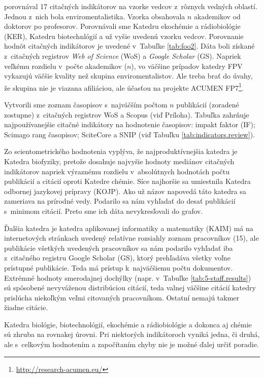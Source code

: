 \citet{Wildgaard2015} porovnával 17 citačných indikátorov na vzorke vedcov
z~rôznych vedných oblastí. Jednou z~nich bola enviromentalistika. Vzorka
obsahovala $n$ akademikov od doktorov po profesorov. Porovnávali sme Katedru
ekochémie a rádiobiológie (KER), Katedru biotechnlógií a už vyšie uvedenú vzorku
vedcov.  Porovnanie hodnôt citačných indikátorov je uvedené v~Tabuľke
\ref{tab:foo2}.  Dáta boli získané z~citačných registrov \emph{Web of
Science} (WoS) a \emph{Google Scholar} (GS).  Napriek veľkému rozdielu v~počte
akademikov ($n$), vo väčšine prípadov katedry FPV vykazujú väčšie kvality než
skupina enviromentalistov. Ale treba brať do úvahy, že skupina nie je viazana
afiliáciou, ale účasťou na projekte ACUMEN
FP7\footnote{\url{http://research-acumen.eu/}}.

Vytvorili sme zoznam časopisov s~najväčším počtom $n$ publikácií (zoradené
zostupne) z~citačných registrov WoS a Scopus (viď Príloha).  Tabuľka zahrňuje
najpoužívanejšie citačné indikátory na hodnotenie časopisov: impakt faktor
(IF); Scimago rang časopisov; SciteCore a SNIP (viď Tabuľku
\ref{tab:indicators.review}).

Zo scientometrického hodnotenia vyplýva, že najproduktívnejšia katedra je
Katedra biofyziky, pretože dosahuje najvyšie hodnoty mediánov citačných
indikátorov napriek výraznému rozdielu v~absolútnych hodnotách počtu publikácií
a citácií oproti Katedre chémie. Síce najhoršie sa umiestnila Katedra odbornej
jazykovej prípravy (KOJP). Ako už názov napovedá táto katedra sa zameriava na
prírodné vedy. Podarilo sa nám vyhľadať do desať publikácií s~minimom citácií.
Preto sme ich dáta nevykresľovali do grafov. 

Ďalšia katedra je katedra aplikovanej informatiky a matematiky (KAIM) má na
internetových stránkach uvedený relatívne rozsiahly zoznam pracovníkov (15),
ale publikácie všetkých uvedených pracovníkov sa nám podarilo vyhľadať iba
z~citačného registru Google Scholar (GS), ktorý prehľadáva všetky voľne prístupné
publikácie. Teda má prístup k~najväčšiemu počtu dokumentov. Extrémné hodnoty
smerodajnej dochýlky (napr. v~Tabuľke \ref{tab:5-staff.results}) sú spôsobené
nevyváženou distribúciou citácií, teda valnej väčšine citácií katedry prislúcha
niekoľkým veľmi citovaných pracovníkom. Ostatní nemajú takmer žiadne citácie.

Katedra biológie, biotechnológií, ekochémie a rádiobiológie a dokonca aj chémie
sú zhruba na rovnakej úrovni. Pri niektorých indikátoroch vyniká jedna, či
druhá, ale s~celkovým hodnotením a započítaním chyby nie je možné ďalej určiť
poradie.


